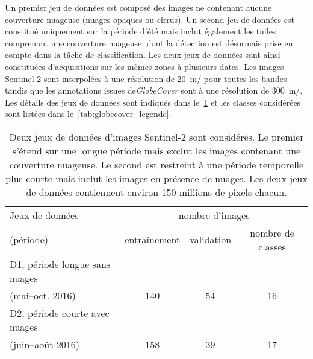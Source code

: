Un premier jeu de données est composé des images ne contenant aucune couverture nuageuse (nuages opaques ou cirrus). Un second jeu de données est constitué uniquement sur la période d'été mais inclut également les tuiles comprenant une couverture nuageuse, dont la détection est désormais prise en compte dans la tâche de classification. Les deux jeux de données sont ainsi constituées d'acquisitions sur les mêmes zones à plusieurs dates. Les images Sentinel-2 sont interpolées à une résolution de \SI{20}{\meter/\px} pour toutes les bandes tandis que les annotations issues de\emph{GlobeCover} sont à une résolution de \SI{300}{\meter/\px}. Les détails des jeux de données sont indiqués dans le~\cref{tab:datasets} et les classes considérées sont listées dans le~\cref{tab:globecover_legende}.

\begin{table}[h]
\caption[Descriptifs des deux jeux de données d'images Sentinel-2 considérés.]{Deux jeux de données d'images Sentinel-2 sont considérés. Le premier s'étend sur une longue période mais exclut les images contenant une couverture nuageuse. Le second est restreint à une période temporelle plus courte mais inclut les images en présence de nuages. Les deux jeux de données contiennent environ 150 millions de pixels chacun.}
\label{tab:datasets}
\begin{tabular}{lccc}
\toprule
Jeux de données & \multicolumn{3}{c}{nombre d'images}\\
(période)  & entraînement & validation  & nombre de classes \\
\midrule
D1, période longue sans nuages & & & \\
 (mai--oct. 2016) & 140 & 54 & 16 \\
\midrule
D2, période courte avec nuages & & & \\
(juin--août 2016) & 158 & 39 & 17 \\
\bottomrule
\end{tabular}
\end{table}

